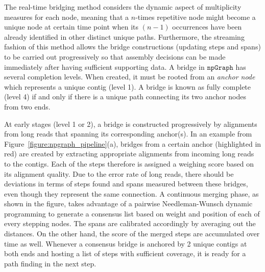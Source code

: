 \documentclass[10pt,letterpaper]{article}
\newcommand{\npgraph}{$\mathtt{npGraph}$}
\begin{document}
The real-time bridging method considers the dynamic aspect of multiplicity measures for each node, meaning that a $n$-times repetitive node might become a unique node at certain time point when its $(n-1)$ occurrences have been already identified in other distinct unique paths. 
Furthermore, the streaming fashion of this method allows the bridge constructions (updating steps and spans) to be carried out progressively so that assembly decisions can be made immediately after having sufficient supporting data.
A bridge in \npgraph{} has several completion levels. When created, it must be rooted from an \emph{anchor node} which represents a unique contig (level 1). A bridge is known as fully complete (level 4) if and only if there is a unique path connecting its two anchor nodes from two ends. 


At early stages (level 1 or 2), a bridge is constructed progressively by alignments from long reads that spanning its corresponding anchor(s).
In an example from Figure~\ref{figure:npgraph_pipeline}(a), bridges from a certain anchor (highlighted in red) are created by extracting appropriate alignments from incoming long reads to the contigs. Each of the steps therefore is assigned a weighing score based on its alignment quality.
Due to the error rate of long reads, there should be deviations in terms of steps found and spans measured between these bridges, even though they represent the same connection.
A continuous merging phase, as shown in the figure, takes advantage of a pairwise Needleman-Wunsch dynamic programming to generate a consensus list based on weight and position of each of every stepping nodes. The spans are calibrated accordingly by averaging out the distances. On the other hand, the score of the merged steps are accumulated over time as well.
Whenever a consensus bridge is anchored by 2 unique contigs at both ends and hosting a list of steps with sufficient coverage, it is ready for a path finding in the next step.
\end{document}
